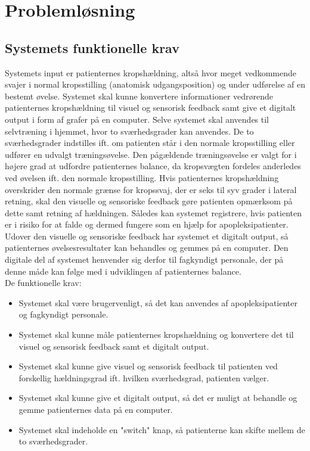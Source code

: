 \chapter{Problemløsning}
\section{Systemets funktionelle krav}
Systemets input er patienternes kropshældning, altså hvor meget vedkommende svajer i normal kropsstilling (anatomisk udgangsposition) og under udførelse af en bestemt øvelse. Systemet skal kunne konvertere informationer vedrørende patienternes kropshældning til visuel og sensorisk feedback samt give et digitalt output i form af grafer på en computer. Selve systemet skal anvendes til selvtræning i hjemmet, hvor to sværhedsgrader kan anvendes. De to sværhedsgrader indstilles ift. om patienten står i den normale kropsstilling eller udfører en udvalgt træningsøvelse. Den pågældende træningsøvelse er valgt for i højere grad at udfordre patienternes balance, da kropsvægten fordeles anderledes ved øvelsen ift. den normale kropsstilling. Hvis patienternes kropshældning overskrider den normale grænse for kropssvaj, der er seks til syv grader i lateral retning, skal den visuelle og sensoriske feedback gøre patienten opmærksom på dette samt retning af hældningen. Således kan systemet registrere, hvis patienten er i risiko for at falde og dermed fungere som en hjælp for apopleksipatienter. Udover den visuelle og sensoriske feedback har systemet et digitalt output, så patienternes øvelsesresultater kan behandles og gemmes på en computer. Den digitale del af systemet henvender sig derfor til fagkyndigt personale, der på denne måde kan følge med i udviklingen af patienternes balance.\\

De funktionelle krav:
\begin{itemize}
\item Systemet skal være brugervenligt, så det kan anvendes af apopleksipatienter og fagkyndigt personale.
\item Systemet skal kunne måle patienternes kropshældning og konvertere det til visuel og sensorisk feedback samt et digitalt output.
\item Systemet skal kunne give visuel og sensorisk feedback til patienten ved forskellig hældningsgrad ift. hvilken sværhedsgrad, patienten vælger.
\item Systemet skal kunne give et digitalt output, så det er muligt at behandle og gemme patienternes data på en computer.
\item Systemet skal indeholde en "switch" knap, så patienterne kan skifte mellem de to sværhedsgrader.
\end{itemize}


